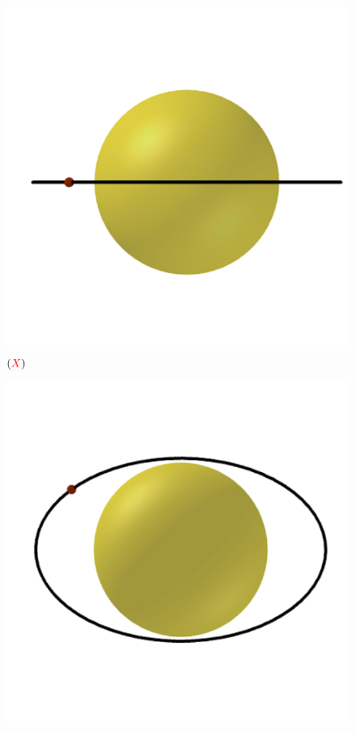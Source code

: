 \documentclass[a4paper, 12pt]{article}
\newcommand{\red}[1]{\textcolor{red}{#1}}
\begin{document}
\begin{flushleft}
\begin{itemize}
\begin{itemize}
\begin{multicols}{3}
\begin{figure}[H]
							\includegraphics[scale=0.2]{./img/5b1.png}
							\captionsetup{labelformat=empty}
							\caption{$(\red{X})$}
						\end{figure}
						\begin{figure}[H]
							\centering
							\includegraphics[scale=0.2]{./img/5b2.png}

\end{figure}
\end{multicols}
\end{itemize}
\end{itemize}
\end{flushleft}
\end{document}
